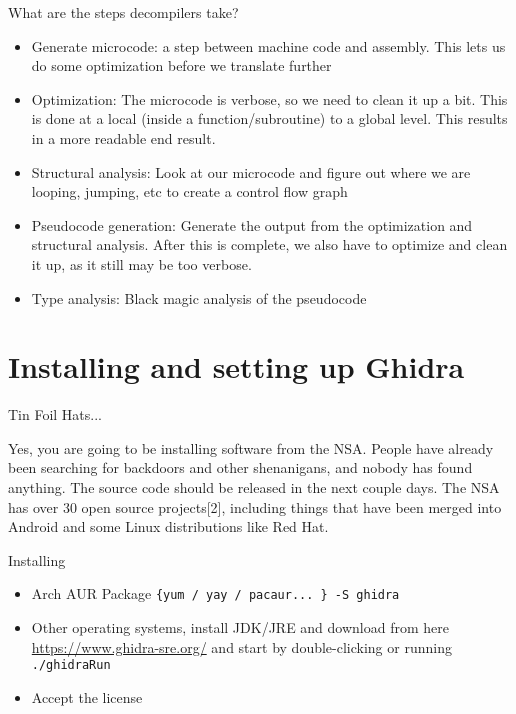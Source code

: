 \documentclass{beamer}
\begin{document}
\begin{frame}{What are the steps decompilers take?}


  \begin{itemize}
    \item Generate microcode: a step between machine code and
      assembly. This lets us do some optimization before we translate
      further
    \item Optimization: The microcode is verbose, so we need to clean
      it up a bit. This is done at a local (inside a
      function/subroutine) to a global level. This results in a more
      readable end result.
    \item Structural analysis: Look at our microcode and figure out
      where we are looping, jumping, etc to create a control flow
      graph
    \item Pseudocode generation: Generate the output from the
      optimization and structural analysis. After this is complete, we
      also have to optimize and clean it up, as it still may be too
      verbose.
    \item Type analysis: Black magic analysis of the pseudocode
  \end{itemize}
\end{frame}

\section{Installing and setting up Ghidra}

\begin{frame}{Tin Foil Hats...}

  Yes, you are going to be installing software from the NSA. People
  have already been searching for backdoors and other shenanigans, and
  nobody has found anything. The source code should be released in the
  next couple days. The NSA has over 30 open source projects[2],
  including things that have been merged into Android and some Linux
  distributions like Red Hat.
\end{frame}

\begin{frame}{Installing}
  \begin{itemize}
    \item Arch AUR Package \texttt{\{yum / yay / pacaur... \} -S
        ghidra}
      \item Other operating systems, install JDK/JRE and download from
        here \url{https://www.ghidra-sre.org/} and start by
        double-clicking or running \texttt{./ghidraRun}
      \item Accept the license
  \end{itemize}
\end{frame}
\end{document}
